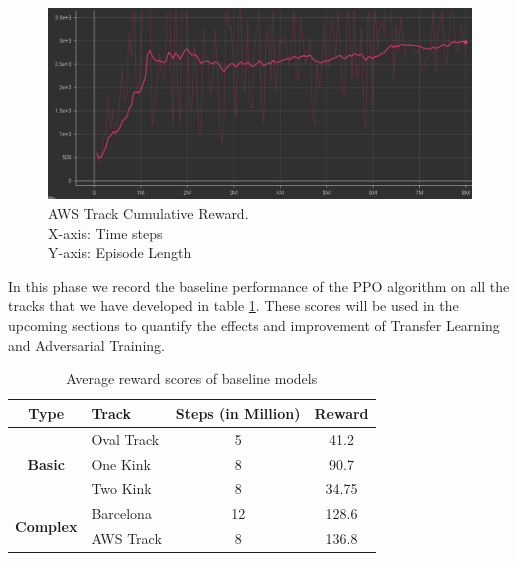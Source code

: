 \begin{figure}[H]
    \centering
    \includegraphics[width=1.0\textwidth]{images/graphs/AWS-EpisodeLength.png}
    \caption{\centering AWS Track Cumulative Reward. \\ X-axis: Time steps \\ Y-axis: Episode Length}
    \label{fig:rl}
\end{figure}

In this phase we record the baseline performance of the PPO algorithm on all the tracks that we have developed in table \ref{tab:baseline}. These scores will be used in the upcoming sections to quantify the effects and improvement of Transfer Learning and Adversarial Training.


\begin{table}[H]
\centering\begin{tabular}{|c|l|c|c|}
\hline
\textbf{Type}                                         & \textbf{Track} & \textbf{Steps (in Million)} & \textbf{Reward} \\ \hline
\multicolumn{1}{|c|}{\multirow{3}{*}{\textbf{Basic}}} & Oval Track     &  5                           &    41.2             \\ \cline{2-4} 
\multicolumn{1}{|c|}{}                                & One Kink       & 8                            &  90.7               \\ \cline{2-4} 
\multicolumn{1}{|c|}{}                                & Two Kink       & 8                           & 34.75           \\ \hline
\multirow{2}{*}{\textbf{Complex}}                     & Barcelona      & 12                         &   128.6              \\ \cline{2-4} 
                                                      & AWS Track      &        8                     & 136.8                 \\ \hline
\end{tabular}
\caption{Average reward scores of baseline models}
\label{tab:baseline}
\end{table}

